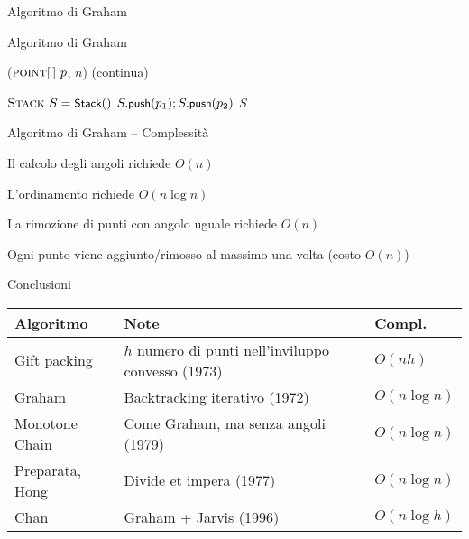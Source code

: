 \begin{frame}{Algoritmo di Graham}

\vspace{-12pt}

\end{frame}

\begin{frame}{Algoritmo di Graham}

\vspace{-9pt}
\begin{Procedure}
\caption[A]{\Stack \graham($\textsc{point}[\,]\ p$, \INTEGER $n$) (continua)}
$\textsc{Stack}\ S = \textsf{{\small Stack}}()$\;
$S.\textsf{{\small push}}(p_1); S.\textsf{{\small push}}(p_2)$\;
\Return $S$\;  
\end{Procedure}

\end{frame}

\begin{frame}{Algoritmo di Graham -- Complessità}

\vspace{-9pt}
\begin{myboxtitle}
\BI
\item Il calcolo degli angoli richiede $O(n)$
\item L'ordinamento richiede $O(n \log n)$
\item La rimozione di punti con angolo uguale richiede $O(n)$
\item Ogni punto viene aggiunto/rimosso al massimo una volta
(costo $O(n)$)
\EI
\end{myboxtitle}

\end{frame}

\begin{frame}{Conclusioni}

\begin{tabular}{|P{3cm}|P{5.8cm}|P{1.8cm}|}
\hline
\textbf{Algoritmo} & \textbf{Note} & \textbf{Compl.} \\\hline
Gift packing & $h$ numero di punti nell'inviluppo convesso (1973)& $O(nh)$\\\hline
Graham  & Backtracking iterativo (1972)& $O(n \log n)$\\\hline
Monotone Chain  & Come Graham, ma senza angoli (1979) & $O(n \log n)$ \\\hline
Preparata, Hong  & Divide et impera (1977) & $O(n \log n)$ \\\hline
Chan  & Graham + Jarvis (1996) & $O(n \log h)$ \\\hline
\end{tabular}




\end{frame}

